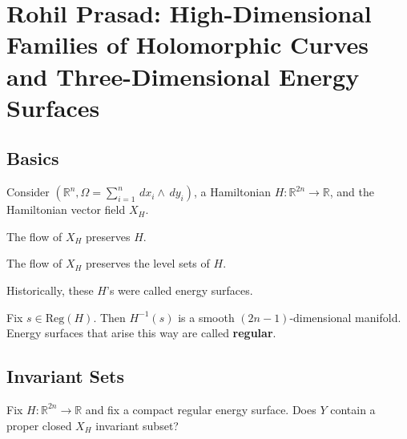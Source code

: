 \chapter{Rohil Prasad: High-Dimensional Families of Holomorphic Curves and Three-Dimensional Energy Surfaces}
\label{prasad}


\section{Basics}

Consider $(\mathbb{R}^n, \Omega = \sum_{i=1}^n \,dx_i \wedge \,dy_i)$, a Hamiltonian $H:\mathbb{R}^{2n} \to \mathbb{R}$, and the Hamiltonian vector field $X_H$.

\begin{lemma}

The flow of $X_H$ preserves $H$.

\end{lemma}

\begin{corollary}

The flow of $X_H$ preserves the level sets of $H$.

\end{corollary}

\begin{remark}

Historically, these $H$'s were called energy surfaces.

\end{remark}

\begin{definition}

Fix $s\in \text{Reg}(H)$. Then $ H^{-1}(s)$ is a smooth $(2n-1)$-dimensional manifold. Energy surfaces that arise this way are called \textbf{regular}.

\end{definition}

\section{Invariant Sets}

\begin{problem}

Fix $H:\mathbb{R}^{2n}\to \mathbb{R}$ and fix a compact regular energy surface. Does $Y$ contain a proper closed $X_H$ invariant subset?

\end{problem}


